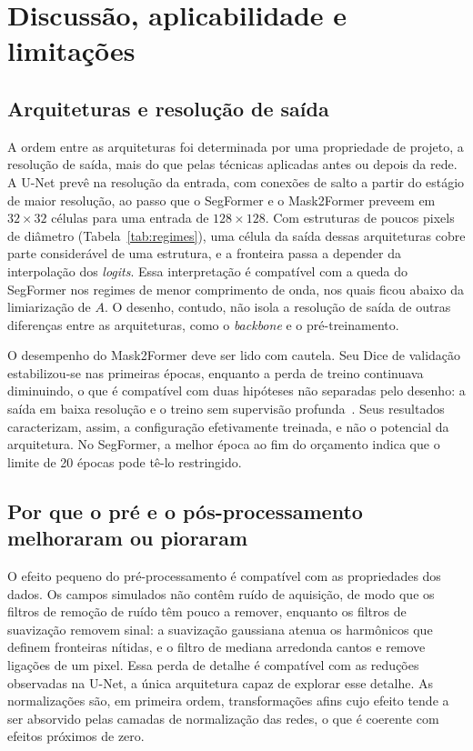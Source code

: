 \documentclass[final,5p,times,twocolumn]{elsarticle}
\begin{document}
\section{Discussão, aplicabilidade e limitações}\label{sec:sec6}

\subsection{Arquiteturas e resolução de saída}\label{subsec:disc_arch}

A ordem entre as arquiteturas foi determinada por uma propriedade de projeto, a resolução de saída, mais do que pelas técnicas aplicadas antes ou depois da rede. A U-Net prevê na resolução da entrada, com conexões de salto a partir do estágio de maior resolução, ao passo que o SegFormer e o Mask2Former preveem em $32\times32$ células para uma entrada de $128\times128$. Com estruturas de poucos pixels de diâmetro (Tabela~\ref{tab:regimes}), uma célula da saída dessas arquiteturas cobre parte considerável de uma estrutura, e a fronteira passa a depender da interpolação dos \textit{logits}. Essa interpretação é compatível com a queda do SegFormer nos regimes de menor comprimento de onda, nos quais ficou abaixo da limiarização de $A$. O desenho, contudo, não isola a resolução de saída de outras diferenças entre as arquiteturas, como o \textit{backbone} e o pré-treinamento.

O desempenho do Mask2Former deve ser lido com cautela. Seu Dice de validação estabilizou-se nas primeiras épocas, enquanto a perda de treino continuava diminuindo, o que é compatível com duas hipóteses não separadas pelo desenho: a saída em baixa resolução e o treino sem supervisão profunda~\cite{cheng2022mask2former}. Seus resultados caracterizam, assim, a configuração efetivamente treinada, e não o potencial da arquitetura. No SegFormer, a melhor época ao fim do orçamento indica que o limite de 20 épocas pode tê-lo restringido.

\subsection{Por que o pré e o pós-processamento melhoraram ou pioraram}\label{subsec:disc_why}

O efeito pequeno do pré-processamento é compatível com as propriedades dos dados. Os campos simulados não contêm ruído de aquisição, de modo que os filtros de remoção de ruído têm pouco a remover, enquanto os filtros de suavização removem sinal: a suavização gaussiana atenua os harmônicos que definem fronteiras nítidas, e o filtro de mediana arredonda cantos e remove ligações de um pixel. Essa perda de detalhe é compatível com as reduções observadas na U-Net, a única arquitetura capaz de explorar esse detalhe. As normalizações são, em primeira ordem, transformações afins cujo efeito tende a ser absorvido pelas camadas de normalização das redes, o que é coerente com efeitos próximos de zero.
\end{document}
